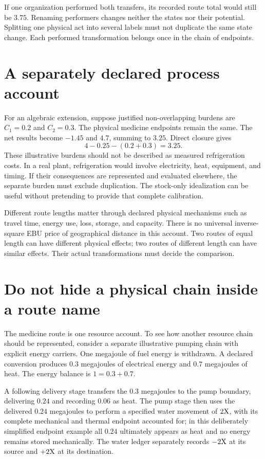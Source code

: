 If one organization performed both transfers, its recorded route total would still be \(3.75\). Renaming performers changes neither the states nor their potential. Splitting one physical act into several labels must not duplicate the same state change. Each performed transformation belongs once in the chain of endpoints.

\section{A separately declared process account}

For an algebraic extension, suppose justified non-overlapping burdens are \(C_1=0.2\) and \(C_2=0.3\). The physical medicine endpoints remain the same. The net results become \(-1.45\) and \(4.7\), summing to \(3.25\). Direct closure gives
\begin{equation}
4-0.25-(0.2+0.3)=3.25.
\end{equation}
These illustrative burdens should not be described as measured refrigeration costs. In a real plant, refrigeration would involve electricity, heat, equipment, and timing. If their consequences are represented and evaluated elsewhere, the separate burden must exclude duplication. The stock-only idealization can be useful without pretending to provide that complete calibration.

Different route lengths matter through declared physical mechanisms such as travel time, energy use, loss, storage, and capacity. There is no universal inverse-square EBU price of geographical distance in this account. Two routes of equal length can have different physical effects; two routes of different length can have similar effects. Their actual transformations must decide the comparison.

\section{Do not hide a physical chain inside a route name}

The medicine route is one resource account. To see how another resource chain should be represented, consider a separate illustrative pumping chain with explicit energy carriers. One megajoule of fuel energy is withdrawn. A declared conversion produces \(0.3\) megajoules of electrical energy and \(0.7\) megajoules of heat. The energy balance is \(1=0.3+0.7\).

A following delivery stage transfers the \(0.3\) megajoules to the pump boundary, delivering \(0.24\) and recording \(0.06\) as heat. The pump stage then uses the delivered \(0.24\) megajoules to perform a specified water movement of \(2\mathrm{X}\), with its complete mechanical and thermal endpoint accounted for; in this deliberately simplified endpoint example all \(0.24\) ultimately appears as heat and no energy remains stored mechanically. The water ledger separately records \(-2\mathrm{X}\) at its source and \(+2\mathrm{X}\) at its destination.

